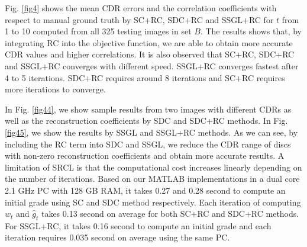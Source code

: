 \documentclass[journal]{IEEEtran}
\begin{document}
\begin{figure*}
	\caption{Samples images with reconstruction coefficients $\textbf{w}$ and resultant CDRs by SSGL and SSGL+RC methods.} \label{fig45}
\end{figure*}

 Fig. \ref{fig4} shows the mean CDR errors and the correlation coefficients with respect to manual ground truth by  SC+RC, SDC+RC and SSGL+RC for $t$ from 1 to 10 computed from all 325 testing images in set $B$. The results shows that, by integrating RC into the objective function, we are able to obtain more accurate CDR values and higher correlations. 
 It is also observed that  SC+RC, SDC+RC and SSGL+RC converges with different speed. SSGL+RC converges fastest after 4 to 5 iterations. SDC+RC requires around 8 iterations and SC+RC requires more iterations to converge.  
 
 In Fig. \ref{fig44}, we show   sample results from two images with different CDRs as well as the reconstruction coefficients by SDC and SDC+RC methods. In Fig. \ref{fig45}, we show the results by SSGL and SSGL+RC methods.  As we can see, by including the RC term into SDC and SSGL, we reduce the CDR range of discs with non-zero reconstruction coefficients and obtain more accurate results.    A limitation of SRCL is that the computational cost increases linearly depending on the number of iterations. Based on our MATLAB implementations in a
 dual core 2.1 GHz PC with 128 GB RAM, it takes 0.27 and
 0.28 second to compute an initial grade using SC and SDC
 method respectively. Each iteration of computing $w_t$ and $\hat{g}_t$
 takes 0.13 second on average for both SC+RC and SDC+RC
 methods. For SSGL+RC, it takes 0.16 second to compute
 an initial grade and each iteration requires 0.035 second on
 average using the same PC.
 
\end{document}
